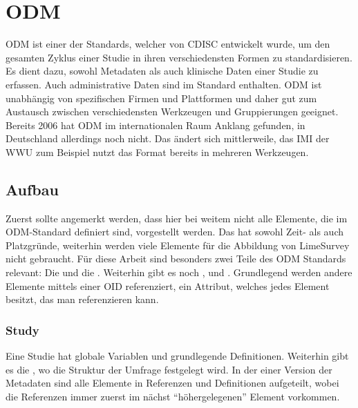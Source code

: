 \section{ODM}
\label{m:odm}


ODM ist einer der Standards, welcher von CDISC entwickelt wurde, um den gesamten Zyklus einer Studie in ihren verschiedensten Formen zu standardisieren.
Es dient dazu, sowohl Metadaten als auch klinische Daten einer Studie zu erfassen. Auch administrative Daten sind im Standard enthalten.
ODM ist unabhängig von spezifischen Firmen und Plattformen und daher gut zum Austausch zwischen verschiedensten Werkzeugen und Gruppierungen geeignet.
Bereits 2006 hat ODM im internationalen Raum Anklang gefunden, in Deutschland allerdings noch nicht.
Das ändert sich mittlerweile, das IMI der WWU zum Beispiel nutzt das Format bereits in mehreren Werkzeugen.

\subsection{Aufbau}

Zuerst sollte angemerkt werden, dass hier bei weitem nicht alle Elemente, die im ODM-Standard definiert sind, vorgestellt werden. Das hat sowohl Zeit- als auch Platzgründe, weiterhin werden viele Elemente für die Abbildung von LimeSurvey nicht gebraucht.
Für diese Arbeit sind besonders zwei Teile des ODM Standards relevant: Die  und die .
Weiterhin gibt es noch ,  und .
Grundlegend werden andere Elemente mittels einer OID referenziert, ein Attribut, welches jedes Element besitzt, das man referenzieren kann.

\subsubsection{Study}

Eine Studie hat globale Variablen und grundlegende Definitionen.
Weiterhin gibt es die , wo die Struktur der Umfrage festgelegt wird.
In der einer Version der Metadaten sind alle Elemente in Referenzen und Definitionen aufgeteilt, wobei die Referenzen immer zuerst im nächst \enquote{höhergelegenen} Element vorkommen.\\

